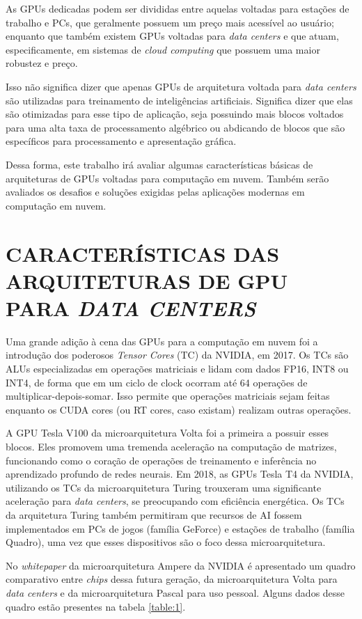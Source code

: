 \documentclass[letterpaper, 10 pt, conference]{ieeeconf}  %
\begin{document}
As GPUs dedicadas podem ser divididas entre aquelas voltadas para estações de trabalho e PCs, que geralmente possuem um preço mais acessível ao usuário; enquanto que também existem GPUs voltadas para \textit{data centers} e que atuam, especificamente, em sistemas de \textit{cloud computing} que possuem uma maior robustez e preço. 

Isso não significa dizer que apenas GPUs de arquitetura voltada para \textit{data centers} são utilizadas para treinamento de inteligências artificiais. Significa dizer que elas são otimizadas para esse tipo de aplicação, seja possuindo mais blocos voltados para uma alta taxa de processamento algébrico ou abdicando de blocos que são específicos para processamento e apresentação gráfica.

Dessa forma, este trabalho irá avaliar algumas características básicas de arquiteturas de GPUs voltadas para computação em nuvem. Também serão avaliados os desafios e soluções exigidas pelas aplicações modernas em computação em nuvem.

\section{CARACTERÍSTICAS DAS ARQUITETURAS DE GPU PARA \textit{DATA CENTERS}}

Uma grande adição à cena das GPUs para a computação em nuvem foi a introdução dos poderosos \textit{Tensor Cores} (TC) da NVIDIA, em 2017. Os TCs são ALUs especializadas em operações matriciais e lidam com dados FP16, INT8 ou INT4, de forma que em um ciclo de clock ocorram até 64 operações de multiplicar-depois-somar. Isso permite que operações matriciais sejam feitas enquanto os CUDA cores (ou RT cores, caso existam) realizam outras operações. 

A GPU Tesla V100 da microarquitetura Volta foi a primeira a possuir esses blocos. Eles promovem uma tremenda aceleração na computação de matrizes, funcionando como o coração de operações de treinamento e inferência no aprendizado profundo de redes neurais. Em 2018, as GPUs Tesla T4 da NVIDIA, utilizando os TCs da microarquitetura Turing trouxeram uma significante aceleração para \textit{data centers}, se preocupando com eficiência energética. Os TCs da arquitetura Turing também permitiram que recursos de AI fossem implementados em PCs de jogos (família GeForce) e estações de trabalho (família Quadro), uma vez que esses dispositivos são o foco dessa microarquitetura.

No \textit{whitepaper} da microarquitetura Ampere da NVIDIA é apresentado um quadro comparativo entre \textit{chips} dessa futura geração, da microarquitetura Volta para \textit{data centers} e da microarquitetura Pascal para uso pessoal. Alguns dados desse quadro estão presentes na tabela \ref{table:1}.
\end{document}
